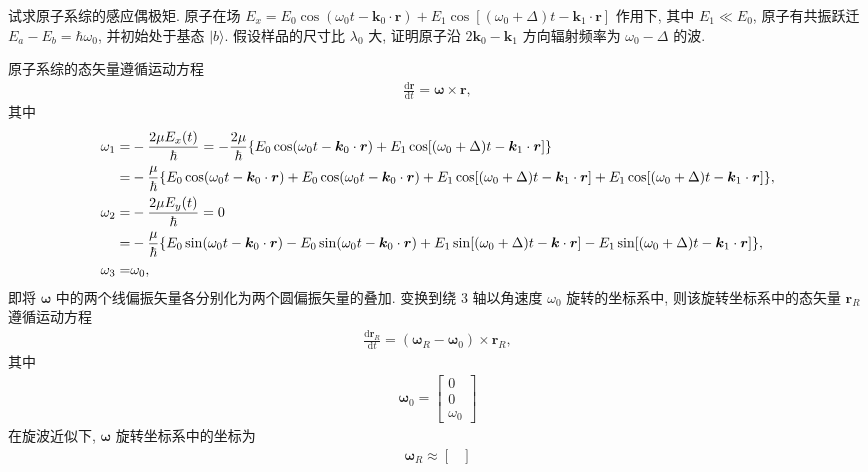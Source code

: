 \documentclass[twoside]{note}
\begin{document}
\begin{exe}
    试求原子系综的感应偶极矩. 原子在场 $E_x=E_0\cos(\omega_0t-\bm{k}_0\cdot\bm{r})+E_1\cos[(\omega_0+\Delta)t-\bm{k}_1\cdot\bm{r}]$ 作用下, 其中 $E_1\ll E_0$, 原子有共振跃迁 $E_a-E_b=\hbar\omega_0$, 并初始处于基态 $\lvert b\rangle$. 假设样品的尺寸比 $\lambda_0$ 大, 证明原子沿 $2\bm{k}_0-\bm{k}_1$ 方向辐射频率为 $\omega_0-\Delta$ 的波.
\end{exe}
\begin{sol}
    原子系综的态矢量遵循运动方程
    \begin{align}
        \frac{\mathrm{d}\bm{r}}{\mathrm{d}t}=\bm{\omega}\times\bm{r},
    \end{align}
    其中
    \begin{align}
        \notag\omega_1=&-\frac{2\mu E_x(t)}{\hbar}=-\frac{2\mu}{\hbar}\{E_0\cos(\omega_0t-\bm{k}_0\cdot\bm{r})+E_1\cos[(\omega_0+\Delta)t-\bm{k}_1\cdot\bm{r}]\}\\
        =&-\frac{\mu}{\hbar}\{E_0\cos(\omega_0t-\bm{k}_0\cdot\bm{r})+E_0\cos(\omega_0t-\bm{k}_0\cdot\bm{r})+E_1\cos[(\omega_0+\Delta)t-\bm{k}_1\cdot\bm{r}]+E_1\cos[(\omega_0+\Delta)t-\bm{k}_1\cdot\bm{r}]\},\\
        \notag\omega_2=&-\frac{2\mu E_y(t)}{\hbar}=0\\
        =&-\frac{\mu}{\hbar}\{E_0\sin(\omega_0t-\bm{k}_0\cdot\bm{r})-E_0\sin(\omega_0t-\bm{k}_0\cdot\bm{r})+E_1\sin[(\omega_0+\Delta)t-\bm{k}\cdot\bm{r}]-E_1\sin[(\omega_0+\Delta)t-\bm{k}_1\cdot\bm{r}]\},\\
        \omega_3=&\omega_0,
    \end{align}
    即将 $\bm{\omega}$ 中的两个线偏振矢量各分别化为两个圆偏振矢量的叠加.
    变换到绕 3 轴以角速度 $\omega_0$ 旋转的坐标系中, 则该旋转坐标系中的态矢量 $\bm{r}_R$ 遵循运动方程
    \begin{align}
        \frac{\mathrm{d}\bm{r}_R}{\mathrm{d}t}=(\bm{\omega}_R-\bm{\omega}_0)\times\bm{r}_R,
    \end{align}
    其中
    \begin{align}
        \bm{\omega}_0=\begin{bmatrix}
            0\\
            0\\
            \omega_0
        \end{bmatrix}
    \end{align}
    在旋波近似下, $\bm{\omega}$ 旋转坐标系中的坐标为
    \begin{align}
        \bm{\omega}_R\approx\begin{bmatrix}

\end{bmatrix}
\end{align}
\end{sol}
\end{document}
